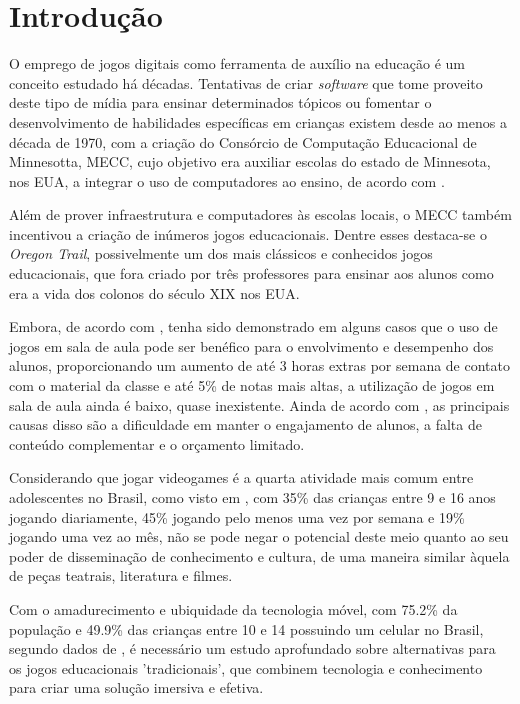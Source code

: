 \chapter{Introdução} \label{cap-introducao}

O emprego de jogos digitais como ferramenta de auxílio na 
educação é um conceito estudado há décadas. Tentativas de 
criar \textit{software} que tome proveito deste tipo de 
mídia para ensinar determinados tópicos ou fomentar o 
desenvolvimento de habilidades específicas em crianças 
existem desde ao menos a década de 1970, com a criação do 
Consórcio de Computação Educacional de Minnesotta, MECC, 
cujo objetivo era auxiliar escolas do estado de Minnesota, 
nos EUA, a integrar o uso de computadores ao ensino, de 
acordo com \cite{lussenhop:2016:oregon-trail}.

Além de prover infraestrutura e computadores às escolas 
locais, o MECC também incentivou a criação de inúmeros 
jogos educacionais. Dentre esses destaca-se o 
\textit{Oregon Trail}, possivelmente um dos mais 
clássicos e conhecidos jogos educacionais, que fora 
criado por três professores para ensinar aos alunos 
como era a vida dos colonos do século XIX nos EUA. 

Embora, de acordo com \cite{poli:2012:video-game-spore}, 
tenha sido demonstrado em alguns casos que o uso de 
jogos em sala de aula pode ser benéfico para o 
envolvimento e desempenho dos alunos, proporcionando 
um aumento de até 3 horas extras por semana de contato 
com o material da classe e até 5\% de notas mais 
altas, a utilização de jogos em sala de aula ainda 
é baixo, quase inexistente. Ainda de acordo com 
\cite{poli:2012:video-game-spore}, as principais causas 
disso são a dificuldade em manter o engajamento de 
alunos, a falta de conteúdo complementar e o orçamento 
limitado.

Considerando que jogar videogames é a quarta atividade 
mais comum entre adolescentes no Brasil, como visto em 
\cite{bndes:2014:mapeamento}, com 35\% das crianças 
entre 9 e 16 anos jogando diariamente, 45\% jogando 
pelo menos uma vez por semana e 19\% jogando uma vez 
ao mês, não se pode negar o potencial deste meio quanto 
ao seu poder de disseminação de conhecimento e cultura, 
de uma maneira similar àquela de peças teatrais, 
literatura e filmes.

Com o amadurecimento e ubiquidade da tecnologia móvel, 
com 75.2\% da população e 49.9\% das crianças entre 10 
e 14 possuindo um celular no Brasil, segundo dados de 
\cite{IBGE:2015:PNAD_TIC_2013}, é necessário um estudo 
aprofundado sobre alternativas para os jogos educacionais 
'tradicionais', que combinem tecnologia e conhecimento 
para criar uma solução imersiva e efetiva.

